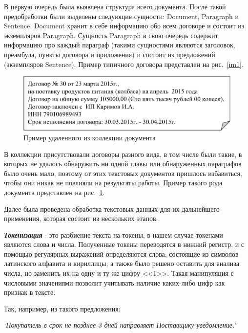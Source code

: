 \documentclass[12pt]{article}
\begin{document}
В первую очередь была выявлена структура всего документа. После такой предобработки были выделены следующие сущности: Document, Paragraph и Sentence. Document хранит в себе информацию обо всем договоре и состоит из экземпляров Paragraph. Сущность Paragraph в свою очередь содержит информацию про каждый параграф (такими сущностями являются заголовок, преамбула, пункты договора и приложения) и состоит из предложений (экземпляров Sentence). Пример типичного договора представлен на рис.~\ref{im1}. 

\vspace{5pt}
\begin{figure}[h!]
	\includegraphics[scale=0.74]{images/im2.eps}
	\caption{Пример удаленного из коллекции документа}
	\label{im2}
\end{figure}
\vspace{5pt}

В коллекции присутствовали договоры разного вида, в том числе были такие, в которых не удалось обнаружить ни одной главы или обнаруженных параграфов было очень мало, поэтому от этих текстовых документов пришлось избавиться, чтобы они никак не повлияли на результаты работы. Пример такого рода документа представлен на рис.~\ref{im2}.

Далее была проведена обработка текстовых данных для их дальнейшего применения, которая состоит из нескольких этапов.

\vspace{5pt}
\textbf{\textit{Токенизация}} - это разбиение текста на токены, в нашем случае токенами являются слова и числа. Полученные токены переводятся в нижний регистр, и с помощью регулярных выражений определяются  слова, состоящие из символов латинского алфавита и кириллицы,  а также было решено оставить для анализа числа, но заменить их на одну и ту же цифру <<1>>. Такая манипуляция с числовыми значениями позволит учитывать наличие каких-либо цифр как признак в тексте. 

Так, например, из такого предложения:

\vspace{13pt}
\noindent\textit{'Покупатель в срок не позднее 3 дней направляет Поставщику уведомление.'}
\end{document}
